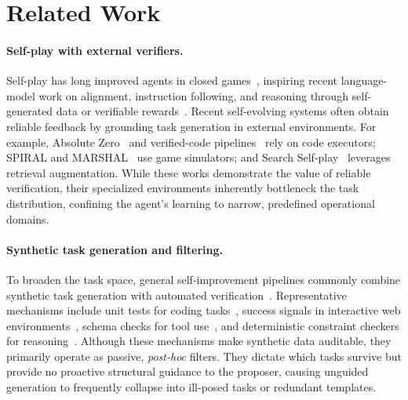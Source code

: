\section{Related Work}
\label{sec:related_work}

\paragraph{Self-play with external verifiers.}
Self-play has long improved agents in closed games~\citep{silver2017mastering,silver2018general}, inspiring recent language-model work on alignment, instruction following, and reasoning through self-generated data or verifiable rewards~\citep{cheng2024self,chen2024self,cheng2024spar,huang2025spotlight,kuba2025language,ren2026seif}. Recent self-evolving systems often obtain reliable feedback by grounding task generation in external environments. For example, Absolute Zero~\citep{zhao2026absolute} and verified-code pipelines~\citep{wilf2025propose} rely on code executors; SPIRAL and MARSHAL~\citep{liu2025spiral,yuan2025marshal} use game simulators; and Search Self-play~\citep{lu2025search} leverages retrieval augmentation. While these works demonstrate the value of reliable verification, their specialized environments inherently bottleneck the task distribution, confining the agent's learning to narrow, predefined operational domains.

\paragraph{Synthetic task generation and filtering.}
To broaden the task space, general self-improvement pipelines commonly combine synthetic task generation with automated verification~\citep{yang2026self}. Representative mechanisms include unit tests for coding tasks~\citep{jimenez2024swe,gehring2024rlef,jiang2025coderl+}, success signals in interactive web environments~\citep{liu2024agentbench,zhou2024webarena,yao2024tau,song2026envscaler}, schema checks for tool use~\citep{li2023api,patil2025berkeley}, and deterministic constraint checkers for reasoning~\citep{zhou2023instruction,jiang2024followbench,qin2024infobench,wen2024benchmarking,pyatkin2025generalizing}. Although these mechanisms make synthetic data auditable, they primarily operate as passive, \emph{post-hoc} filters. They dictate which tasks survive but provide no proactive structural guidance to the proposer, causing unguided generation to frequently collapse into ill-posed tasks or redundant templates.


